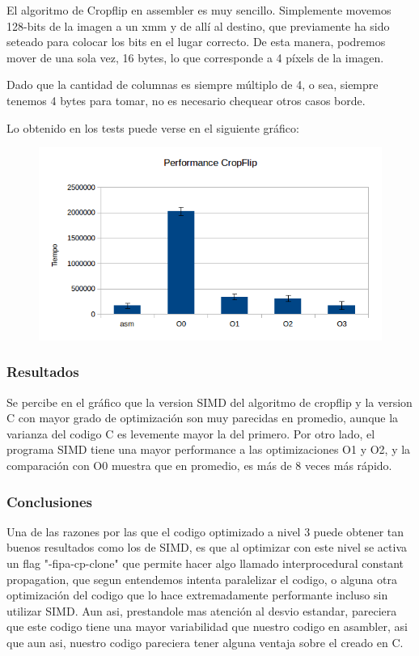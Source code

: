 \documentclass[a4paper]{article}
\begin{document}
El algoritmo de Cropflip en assembler es muy sencillo. Simplemente movemos 128-bits de la imagen a un xmm y de allí al destino, que previamente ha sido seteado para colocar los bits en el lugar correcto. De esta manera, podremos mover de una sola vez, 16 bytes, lo que corresponde a 4 píxels de la imagen.

Dado que la cantidad de columnas es siempre múltiplo de 4, o sea, siempre tenemos 4 bytes para tomar, no es necesario chequear otros casos borde.

Lo obtenido en los tests puede verse en el siguiente gráfico:

\begin{figure}[h!]
  \begin{center}
	\includegraphics[scale=0.66]{Graficos1.4/crop/per.jpg}
	\label{nombreparareferenciar5}
  \end{center}
\end{figure}

\subsubsection{Resultados}

Se percibe en el gráfico que la version SIMD del algoritmo de cropflip  y la version C con mayor grado de optimización son muy parecidas en promedio, aunque la varianza del codigo C es levemente mayor la del primero. Por otro lado, el programa SIMD tiene una mayor performance a las optimizaciones O1 y O2, y la comparación con O0 muestra que en promedio, es más de 8 veces más rápido.

\subsubsection{Conclusiones}
Una de las razones por las que el codigo optimizado a nivel 3 puede obtener tan buenos resultados como los de SIMD, es que al optimizar con este nivel se activa un flag "-fipa-cp-clone" que permite hacer algo llamado interprocedural constant propagation, que segun entendemos intenta paralelizar el codigo, o alguna otra optimización del codigo que lo hace extremadamente performante incluso sin utilizar SIMD. Aun asi, prestandole mas atención al desvio estandar, pareciera que este codigo tiene una mayor variabilidad que nuestro codigo en asambler, asi que aun asi, nuestro codigo pareciera tener alguna ventaja sobre el creado en C.
\end{document}
